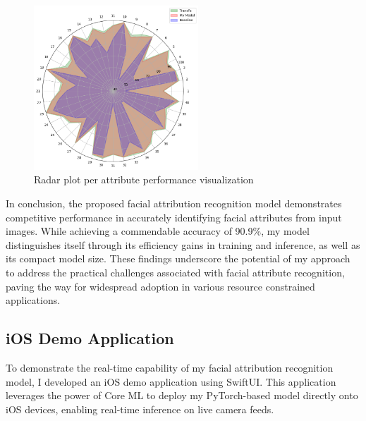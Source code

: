 \documentclass[a4paper,oneside]{article}
\begin{document}
\begin{figure}[h]
  \includegraphics[width=0.55\textwidth]{radarplot.png}
  \centering
  \caption[Radar plot]{Radar plot per attribute performance visualization\footnotemark}
  \centering
\end{figure}


In conclusion, the proposed facial attribution recognition model demonstrates competitive performance in accurately identifying facial attributes from input images.
While achieving a commendable accuracy of 90.9\%, my model distinguishes itself through its efficiency gains in training and inference, as well as its compact model size.
These findings underscore the potential of my approach to address the practical challenges associated with facial attribute recognition, paving the way for widespread adoption in various resource constrained applications.

\subsection{iOS Demo Application}
\label{sec:subsection_ios_demo}

To demonstrate the real-time capability of my facial attribution recognition model, I developed an iOS demo application using SwiftUI.
This application leverages the power of Core ML to deploy my PyTorch-based model directly onto iOS devices, enabling real-time inference on live camera feeds.
\end{document}
